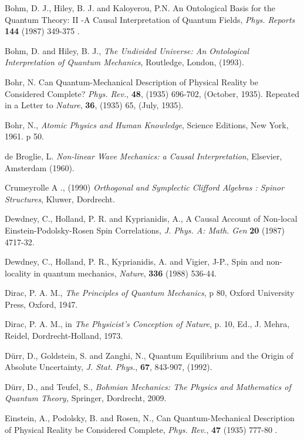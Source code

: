 \documentclass[12pt]{article}
\begin{document}
\begin{thebibliography}{99}
 Bohm, D. J., Hiley, B. J. and  Kaloyerou, P.N. An Ontological Basis for the Quantum Theory: II -A Causal Interpretation of Quantum Fields,   {\em Phys. Reports} {\bf 144} (1987) 349-375 .


 Bohm, D. and Hiley, B. J.,  {\em The Undivided Universe: An Ontological Interpretation of Quantum Mechanics}, Routledge, London, (1993).

   Bohr, N.  Can Quantum-Mechanical Description of Physical Reality be Considered Complete?
{\em Phys. Rev.},  {\bf 48},  (1935) 696-702,  (October, 1935).  Repeated in a  Letter to {\em Nature}, {\bf 36}, (1935) 65, (July, 1935).

 Bohr, N., {\em Atomic Physics and Human Knowledge}, Science Editions, New York, 1961. p 50.

  de Broglie, L.  {\em Non-linear Wave Mechanics: a Causal Interpretation}, Elsevier, Amsterdam (1960).

 Crumeyrolle A ., (1990) {\em Orthogonal and Symplectic Clifford Algebras : Spinor Structures}, Kluwer, Dordrecht.

 Dewdney, C., Holland, P. R. and Kyprianidis, A., A Causal Account of Non-local Einstein-Podolsky-Rosen Spin Correlations, {\em J. Phys. A: Math. Gen} {\bf 20} (1987)  4717-32.

 Dewdney, C., Holland, P. R., Kyprianidis, A. and Vigier, J-P., Spin and non-locality in quantum mechanics, {\em Nature}, {\bf 336} (1988) 536-44.

 Dirac, P. A. M., {\em The Principles of Quantum Mechanics}, p 80, Oxford University Press, Oxford, 1947.

 Dirac, P. A. M., in {\em The Physicist's Conception of Nature}, p. 10, Ed., J. Mehra, Reidel, Dordrecht-Holland, 1973.

 D\"{u}rr, D., Goldstein, S. and Zanghi, N., Quantum Equilibrium and the Origin of Absolute Uncertainty, {\em J. Stat. Phys.}, {\bf 67}, 843-907, (1992).

 D\"{u}rr, D., and Teufel, S., {\em Bohmian Mechanics: The Physics and Mathematics of Quantum Theory,} Springer, Dordrecht, 2009.

 Einstein, A., Podolsky, B. and Rosen, N., Can Quantum-Mechanical Description of Physical Reality be Considered Complete, {\em Phys. Rev.}, {\bf 47} (1935) 777-80 .



\end{thebibliography}
\end{document}
